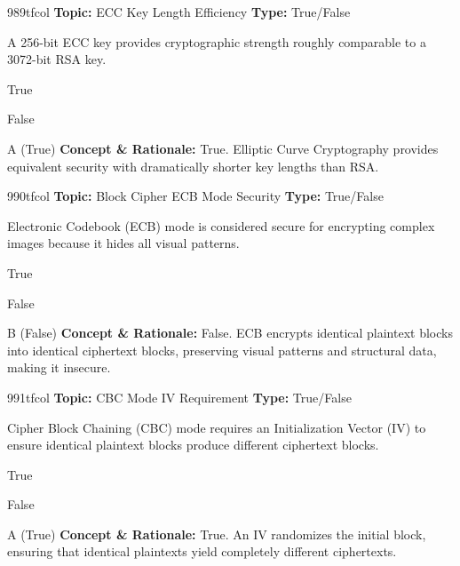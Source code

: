 \begin{qcard}{989}{tfcol}
\textcolor{darkslate!75}{\small\textbf{Topic:} ECC Key Length Efficiency \hfill \textbf{Type:} True/False}\vspace{0.4em}\par
A 256-bit ECC key provides cryptographic strength roughly comparable to a 3072-bit RSA key.
\begin{qoptions}
\item True
\item False
\end{qoptions}
\end{qcard}
\nopagebreak
\begin{explainbox}{A (True)}
\textbf{Concept \& Rationale:} True. Elliptic Curve Cryptography provides equivalent security with dramatically shorter key lengths than RSA.
\end{explainbox}

\begin{qcard}{990}{tfcol}
\textcolor{darkslate!75}{\small\textbf{Topic:} Block Cipher ECB Mode Security \hfill \textbf{Type:} True/False}\vspace{0.4em}\par
Electronic Codebook (ECB) mode is considered secure for encrypting complex images because it hides all visual patterns.
\begin{qoptions}
\item True
\item False
\end{qoptions}
\end{qcard}
\nopagebreak
\begin{explainbox}{B (False)}
\textbf{Concept \& Rationale:} False. ECB encrypts identical plaintext blocks into identical ciphertext blocks, preserving visual patterns and structural data, making it insecure.
\end{explainbox}

\begin{qcard}{991}{tfcol}
\textcolor{darkslate!75}{\small\textbf{Topic:} CBC Mode IV Requirement \hfill \textbf{Type:} True/False}\vspace{0.4em}\par
Cipher Block Chaining (CBC) mode requires an Initialization Vector (IV) to ensure identical plaintext blocks produce different ciphertext blocks.
\begin{qoptions}
\item True
\item False
\end{qoptions}
\end{qcard}
\nopagebreak
\begin{explainbox}{A (True)}
\textbf{Concept \& Rationale:} True. An IV randomizes the initial block, ensuring that identical plaintexts yield completely different ciphertexts.
\end{explainbox}

